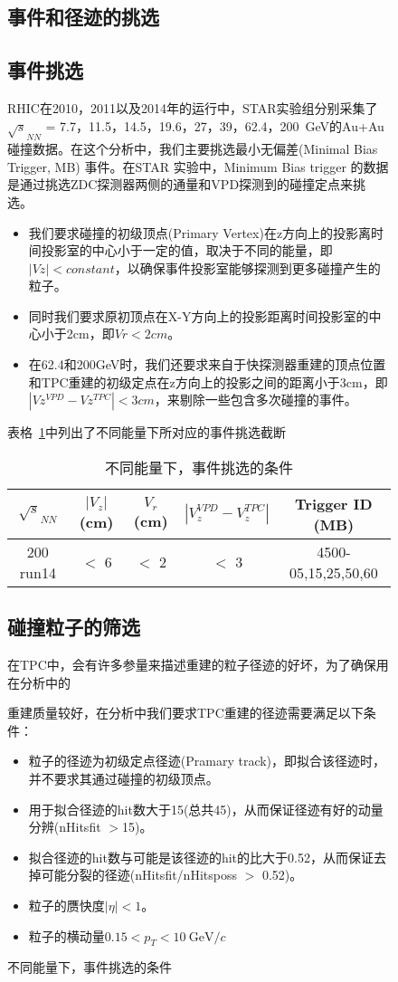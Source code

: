 \begin{figure}[htbp]
\subsection{事件和径迹的挑选}

\subsection{事件挑选}
RHIC在2010，2011以及2014年的运行中，STAR实验组分别采集了$\sqrt{s}_{NN}$ = 7.7，11.5，14.5，19.6，27，39，62.4，200~GeV的Au+Au碰撞数据。在这个分析中，我们主要挑选最小无偏差(Minimal Bias Trigger, MB) 事件。在STAR 实验中，Minimum Bias trigger 的数据是通过挑选ZDC探测器两侧的通量和VPD探测到的碰撞定点来挑选。

\begin{itemize}
\item 我们要求碰撞的初级顶点(Primary Vertex)在z方向上的投影离时间投影室的中心小于一定的值，取决于不同的能量，即$|Vz| < constant$，以确保事件投影室能够探测到更多碰撞产生的粒子。
\item 同时我们要求原初顶点在X-Y方向上的投影距离时间投影室的中心小于2cm，即$Vr < 2cm$。
\item 在62.4和200GeV时，我们还要求来自于快探测器重建的顶点位置和TPC重建的初级定点在z方向上的投影之间的距离小于3cm，即 $|Vz^{VPD}-Vz^{TPC}| < 3cm$，来剔除一些包含多次碰撞的事件。
\end{itemize}
表格~\ref{tab:Event_cut}中列出了不同能量下所对应的事件挑选截断

\begin{table}[htb]
\centering
\caption{不同能量下，事件挑选的条件}
\begin{tabular}{c|c|c|c|c}
\toprule
$\sqrt{s}_{NN}$  &  $|V_{z}|$(cm)  &  $V_{r}$(cm)  &  $|V_{z}^{VPD}-V_{z}^{TPC}|$  &  Trigger ID (MB)                          \\ \hline
200 run14        &  $<$ 6          &  $<$ 2        &  $<$ 3                        &  4500-05,15,25,50,60         \\ 
\bottomrule
\end{tabular}
\label{tab:Event_cut}
\end{table}


\subsection{碰撞粒子的筛选}
在TPC中，会有许多参量来描述重建的粒子径迹的好坏，为了确保用在分析中的


重建质量较好，在分析中我们要求TPC重建的径迹需要满足以下条件：
\begin{itemize}
\item 粒子的径迹为初级定点径迹(Pramary track)，即拟合该径迹时，并不要求其通过碰撞的初级顶点。
\item 用于拟合径迹的hit数大于15(总共45)，从而保证径迹有好的动量分辨(nHitsfit $>$15)。
\item 拟合径迹的hit数与可能是该径迹的hit的比大于0.52，从而保证去掉可能分裂的径迹(nHitsfit/nHitsposs $>$ 0.52)。
\item 粒子的赝快度$|\eta|<1$。
\item 粒子的横动量$0.15<p_{T}<10~\mathrm{GeV}/\mathit{c}$
\end{itemize}



\end{figure}
